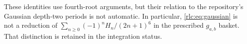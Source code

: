 These identities use fourth-root arguments, but their relation to the
repository's Gaussian depth-two periods is not automatic. In particular,
\eqref{rlc:eq:gaussian} is not a reduction of
$\sum_{n\ge0}(-1)^nH_n/(2n+1)^6$ in the prescribed $g_{a,b}$ basket.
That distinction is retained in the integration status.
